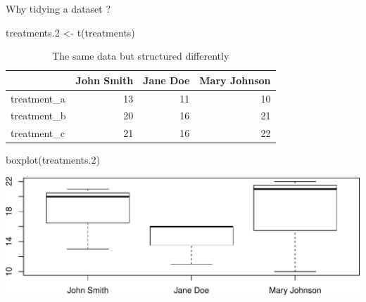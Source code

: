\documentclass[14pt,ignorenonframetext,]{bredelebeamer}
\newenvironment{Shaded}{\begin{snugshade}}{\end{snugshade}}
\newcommand{\KeywordTok}[1]{\textcolor[rgb]{0.94,0.87,0.69}{#1}}
\newcommand{\DecValTok}[1]{\textcolor[rgb]{0.86,0.86,0.80}{#1}}
\newcommand{\StringTok}[1]{\textcolor[rgb]{0.80,0.58,0.58}{#1}}
\newcommand{\NormalTok}[1]{\textcolor[rgb]{0.80,0.80,0.80}{#1}}
\begin{document}
\begin{frame}[fragile]{Why tidying a dataset ?}

\begin{Shaded}
\begin{Highlighting}[]
\NormalTok{treatments.}\DecValTok{2}\NormalTok{ <-}\StringTok{ }\KeywordTok{t}\NormalTok{(treatments)}
\end{Highlighting}
\end{Shaded}

\begin{center}
\begin{table}[t]

\caption{\label{tab:unnamed-chunk-4}The same data but structured differently}
\centering
\begin{tabular}{l|r|r|r}
\hline
  & John Smith & Jane Doe & Mary Johnson\\
\hline
treatment\_a & 13 & 11 & 10\\
\hline
treatment\_b & 20 & 16 & 21\\
\hline
treatment\_c & 21 & 16 & 22\\
\hline
\end{tabular}
\end{table}
\end{center}

\begin{Shaded}
\begin{Highlighting}[]
\KeywordTok{boxplot}\NormalTok{(treatments.}\DecValTok{2}\NormalTok{)}
\end{Highlighting}
\end{Shaded}

\includegraphics{tidyverse_28_03_files/figure-beamer/boxplot2-1.pdf}

\end{frame}
\end{document}
